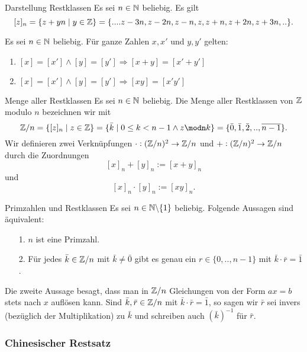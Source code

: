 \begin{corollary}{Darstellung Restklassen}
    Es sei $n\in\mathbb{N}$ beliebig. Es gilt
    \[
        [z]_n=\{z+yn\mid y\in\mathbb{Z}\}=\{....z-3n,z-2n,z-n,z,z+n,z+2n,z+3n,..\}.
    \]
\end{corollary}

\begin{remark}
    Es sei $n\in\mathbb{N}$ beliebig. Für ganze Zahlen $x,x'$ und $y,y'$ gelten:
    \begin{enumerate}
        \item $[x]=[x']\land [y]=[y']\Rightarrow [x+y]=[x'+y']$
        \item $[x]=[x']\land [y]=[y']\Rightarrow [xy]=[x'y']$
    \end{enumerate}
\end{remark}

\begin{definition}{Menge aller Restklassen}
    Es sei $n\in\mathbb{N}$ beliebig. Die Menge aller Restklassen von $\mathbb{Z}$ modulo $n$ bezeichnen wir mit
    \[
        \Z/n=\{[z]_n\mid z\in\Z\}=\{\bar k\mid 0\leq k<n-1\wedge z\modn k\}=\{\bar 0,\bar1,\bar2,..,\overline{n-1}\}.
    \]
    Wir definieren zwei Verknüpfungen $\cdot:(\mathbb{Z}/n)^2\rightarrow \mathbb{Z}/n$ und $+:(\mathbb{Z}/n)^2\rightarrow \mathbb{Z}/n$ durch die Zuordnungen
    \[
        [x]_n+[y]_n:=[x+y]_n
    \]
    und
    \[
        [x]_n\cdot[y]_n:=[xy]_n.
    \]
\end{definition}

\begin{theorem}{Primzahlen und Restklassen}
    Es sei $n\in\mathbb{N}\backslash\{1\}$ beliebig. Folgende Aussagen sind äquivalent:
    \begin{enumerate}
        \item[1.] $n$ ist eine Primzahl.
        \item[2.] Für jedes $\bar k\in\mathbb{Z}/n$ mit $\bar k\neq\bar 0$ gibt es genau ein $r\in\{0,..,n-1\}$ mit $\bar k\cdot\bar r=\bar 1$.
    \end{enumerate}
    Die zweite Aussage besagt, dass man in $\mathbb{Z}/n$ Gleichungen von der Form $ax=b$ stets nach $x$ auflösen kann. Sind $\bar k,\bar r\in\mathbb{Z}/n$ mit $\bar k\cdot\bar r=\bar 1$, so sagen wir $\bar r$ sei invers (bezüglich der Multiplikation) zu $\bar k$ und schreiben auch $(\bar{k})^{-1}$ für $\bar r$.
\end{theorem}

\subsubsection{Chinesischer Restsatz}

